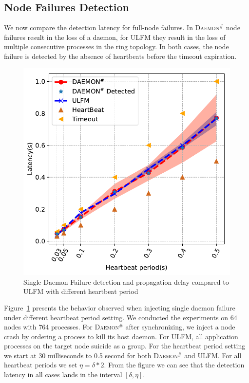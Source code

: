 \documentclass[sigconf]{acmart}
\newcommand{\ulfm}[0]{\textsc{ULFM}\xspace}
\newcommand{\ourwork}[0]{\textsc{Daemon}\ensuremath{^\#}\xspace}
\begin{document}
\subsection{Node Failures Detection}
We now compare the detection latency for full-node failures. In \ourwork
node failures result in the loss of a daemon, for \ulfm they result in 
the loss of multiple consecutive processes in the ring topology. In 
both cases, the node failure is detected by the absence of heartbeats
before the timeout expiration.

\begin{figure}[h]
  \centering
  \includegraphics[width=\linewidth]{PRRTE_ULFM_comparision.pdf}
  \caption{Single Daemon Failure detection and propagation delay compared to \ulfm with different heartbeat period}
  \label{fig:node_failure_hb}
\end{figure}

Figure~\ref{fig:node_failure_hb} presents the behavior observed when injecting single daemon failure under different heartbeat period setting. We conducted the experiments on 64 nodes with 764 processes. For \ourwork after synchronizing, we inject a node crash by ordering a process to kill its host daemon. For \ulfm, 
all application processes on the target node suicide as a group. 
For the heartbeat period setting we start at 30 milliseconds to 0.5 second for both \ourwork and \ulfm. For all heartbeat periods we set $ \eta = \delta * 2 $. From the figure we can see that the detection latency in all cases lands in the interval $[\delta,\eta]$.
\end{document}
